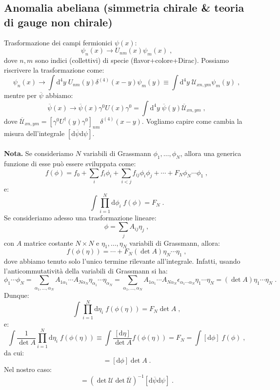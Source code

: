\documentclass[12pt,a4paper]{article}
\theoremstyle{definition}
\newcommand{\diff}[1][]{\mathrm{d}#1}
\newcommand{\adj}[1]{#1^{\dagger}}
\numberwithin{equation}{section}
\begin{document}
\subsection{Anomalia abeliana (simmetria chirale \& teoria di gauge non chirale)}
Trasformazione dei campi fermionici $\psi(x)$:
$$
\psi_n(x)\to U_{nm}(x)\psi_m(x)\;,
$$
dove $n,m$ sono indici (collettivi) di specie (flavor+colore+Dirac). Possiamo riscrivere la trasformazione come:
\begin{equation}
\psi_n(x)\to \int\diff^4{y}\; U_{nm}(y)\delta^{(4)}(x-y)\psi_m(y)\equiv\int\diff^4{y}\;\mathcal{U}_{xn,ym}\psi_m(y)\;,
\end{equation}
mentre per $\overline{\psi}$ abbiamo:
$$
\overline{\psi}(x)\to \overline{\psi}(x)\gamma^0U(x)\gamma^0=\int\diff^4{y}\;\overline{\psi}(y)\overline{\mathcal{U}}_{xn,ym}\;,
$$
dove $\overline{\mathcal{U}}_{xn,ym}=[\gamma^0\adj{U}(y)\gamma^0]_{nm}\delta^{(4)}(x-y)$. Vogliamo capire come cambia la misura dell'integrale $[\diff{\overline{\psi}}\diff{\psi}]$. \\
\\
\textbf{Nota.} Se consideriamo $N$ variabili di Grassmann $\phi_1,\ldots,\phi_N$, allora una generica funzione di esse può essere sviluppata come:
$$
f(\phi)=f_0+\sum_if_i\phi_i+\sum_{i<j}f_{ij}\phi_i\phi_j+\cdots+F_N\phi_N\cdots\phi_1\;,
$$
e:
$$
\int\prod_{i=1}^N\diff{\phi_i}\;f(\phi)=F_N\;.
$$
Se consideriamo adesso una trasformazione lineare:
$$
\phi=\sum_jA_{ij}\eta_j\;,
$$
con $A$ matrice costante $N\times N$ e $\eta_1,\ldots,\eta_N$ variabili di Grassmann, allora:
$$
f(\phi(\eta))=\cdots+ F_N(\det A)\eta_N\cdots\eta_1\;,
$$
dove abbiamo tenuto solo l'unico termine rilevante all'integrale. Infatti, usando l'anticommutatività della variabili di Grassmann si ha:
$$
\phi_1\cdots\phi_N=\sum_{\alpha_1,\ldots,\alpha_N}A_{1\alpha_1}\cdots A_{N\alpha_N}\eta_{\alpha_1}\cdots\eta_{\alpha_N}=\sum_{\alpha_1,\ldots,\alpha_N}A_{1\alpha_1}\cdots A_{N\alpha_N}\epsilon_{\alpha_1\cdots\alpha_N}\eta_1\cdots\eta_N=(\det A)\eta_1\cdots\eta_N\;.
$$
Dunque:
$$
\int\prod_{i=1}^N\diff{\eta_i}\; f(\phi(\eta))=F_N\det A\;,
$$
e:
$$
\int \frac{1}{\det A}\prod_{i=1}^N\diff{\eta_i}\;f(\phi(\eta))\equiv \int\frac{[\diff{\eta}]}{\det A}f(\phi(\eta))=F_N=\int[\diff{\phi}]\;f(\phi)\;,
$$
da cui:
\begin{equation}
[\diff{\eta}]=[\diff{\phi}]\det A\;.
\end{equation}
Nel nostro caso:
\begin{equation}
[\diff{\overline{\psi}'}\diff{\psi'}]=(\det\mathcal{U}\det\overline{\mathcal{U}})^{-1}[\diff{\overline{\psi}}\diff{\psi}]\;.
\end{equation}
\end{document}
